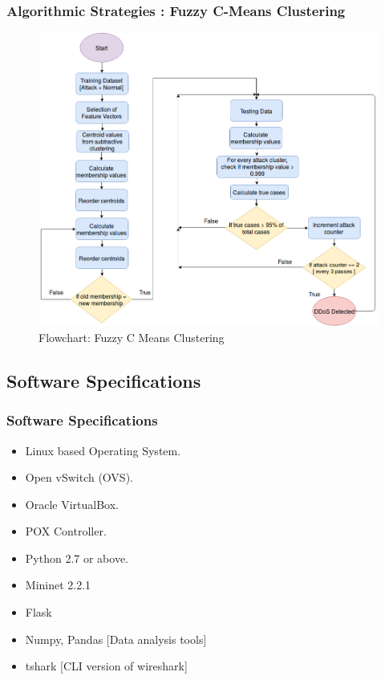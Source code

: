 \documentclass[10pt]{beamer}
\begin{document}
\begin{frame}
\frametitle{Algorithmic Strategies : Fuzzy C-Means Clustering}
\begin{figure}
\includegraphics[scale=0.27]{fuzzy.png}
\caption{\footnotesize Flowchart: Fuzzy C Means Clustering}
\end{figure}
\end{frame}

	

\begin{frame}
\section[]{Software Specifications}
\frametitle{Software Specifications}
\begin{itemize}
\footnotesize
\item
Linux based Operating System.
\item
Open vSwitch (OVS).
\item
Oracle VirtualBox.
\item
POX Controller.
\item
Python 2.7 or above.
\item
Mininet 2.2.1
\item
Flask
\item
Numpy, Pandas [Data analysis tools]
\item
tshark [CLI version of wireshark]
\end{itemize}
\end{frame}
\end{document}
